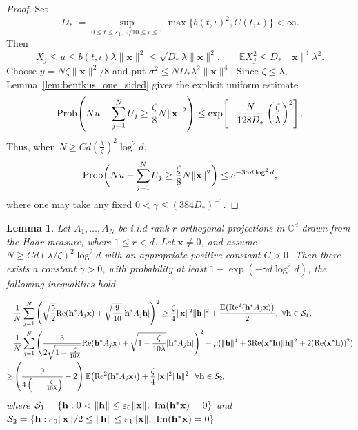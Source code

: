 \documentclass{article}
\newcommand{\C}{{\mathbb C}}
\newcommand{\E}{{\mathbb E}}
\newcommand{\calS}{{\mathcal S}}
\newcommand{\Prob}{{\rm Prob}}
\newcommand{\re}{{\rm Re}}
\newcommand{\im}{{\rm Im}}
\newcommand{\vx}{{\mathbf x}}
\newcommand{\vh}{{\mathbf h}}
\newcommand{\0}{{\mathbf 0}}
\newtheorem{lemma}[theorem]{Lemma}
\numberwithin{equation}{section}
\begin{document}
\begin{proof}
		Set
		\[
		D_*:=\sup_{0\le t\le\varepsilon_1,\,9/10\le\iota\le1}\max\{b(t,\iota)^2,C(t,\iota)\}<\infty.
		\]
		Then
		\[
		X_j\le u\le b(t,\iota)\lambda\|\vx\|^2\le \sqrt{D_*}\lambda\|\vx\|^2.
		\qquad
		\E X_j^2\le D_*\|\vx\|^4\lambda^2.
		\]
		Choose $y=N\zeta\|\vx\|^2/8$ and put $\sigma^2\le ND_*\lambda^2\|\vx\|^4$.  Since $\zeta\le\lambda$, Lemma~\ref{lem:bentkus_one_sided} gives the explicit uniform estimate
		\[
		\Prob\!\left(Nu-\sum_{j=1}^NU_j\ge\frac{\zeta}{8}N\|\vx\|^2\right)
		\le\exp\!\left[-\frac{N}{128D_*
		}\left(\frac{\zeta}{\lambda}\right)^2\right].
		\]
		Thus, when $N\geq Cd\left(\frac{\lambda}{\zeta}\right)^2\log^2d$,
		\begin{align*}
			\Prob\bigg(Nu - \sum_{j=1}^{N}U_j\geq\frac{\zeta}{8}N\|\vx\|^2 \bigg)\leq e^{-3\gamma d\log^2d},
		\end{align*}
		where one may take any fixed $0<\gamma\le(384D_*
		)^{-1}$. 
	\end{proof}
	\begin{lemma}\label{lem:square_estiate}
		Let $A_1,\ldots,A_N$ be i.i.d rank-$r$ orthogonal projections in $\C^d$ drawn from the Haar measure, where $1\le r< d$. Let $\vx\ne0$, and assume $N\ge C d(\lambda/\zeta)^2\log^2d$  with an appropriate positive constant $C>0$. Then there exists a constant $\gamma>0$, with probability at least $1-\exp(-\gamma d\log^2d)$, the following inequalities hold 
		
		\begin{align}
			&\frac{1}{N}\sum^N_{j=1}\Bigg( \sqrt{\frac{5}{2}}\re(\vh^*A_j\vx)+\sqrt{\frac{9}{10}}|\vh^*A_j\vh|\Bigg)^2\ge\frac{\zeta}{4}\|\vx\|^2\|\vh\|^2+\frac{ \E\big(\re^2(\vh^*A_j\vx)\big)}{2},
			\ \forall \vh\in\calS_1,\label{curvature_condition1}\\
			&\frac{1}{N}\sum_{j=1}^{N}\Bigg( \frac{3}{2\sqrt{1-\frac{\zeta}{10\lambda}}}\re(\vh^*A_j\vx)+\sqrt{1-\frac{\zeta}{10\lambda}}|\vh^*A_j\vh|\Bigg)^2-\mu(\|\vh\|^4+3\re(\vx^*\vh)\|\vh\|^2+2(\re(\vx^*\vh))^2)\nonumber\\
			\ge&\left(\frac{9}{4\left(1-\frac{\zeta}{10\lambda}\right)}-2\right)\E\big(\re^2(\vh^*A_j\vx)\big)+\frac{\zeta}{4}\|\vx\|^2\|\vh\|^2,\ \forall \vh\in\calS_2,\label{curvature_condition2}
		\end{align}
		where $\calS_1=\{\vh:0<\|\vh\|\le\varepsilon_0\|\vx\|,\ \im(\vh^*\vx)=0\}$ and $\calS_2=\{\vh:\varepsilon_0\|\vx\|/2\le\|\vh\|\le\varepsilon_1\|\vx\|,\ \im(\vh^*\vx)=0\}$.
	\end{lemma}
	
\end{document}
